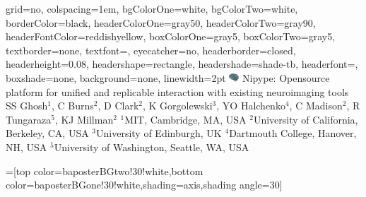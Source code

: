 \documentclass[portrait,final]{baposter}
\begin{document}
\newlength{\leftimgwidth}
\begin{poster}%
  {
  grid=no,
  colspacing=1em,
  bgColorOne=white,
  bgColorTwo=white,
  borderColor=black,
  headerColorOne=gray50,
  headerColorTwo=gray90,
  headerFontColor=reddishyellow,
  boxColorOne=gray5,
  boxColorTwo=gray5,
  textborder=none, %
  textfont=\sf, %
  eyecatcher=no,
  headerborder=closed,
  headerheight=0.08\textheight,
  headershape=rectangle,
  headershade=shade-tb,
  headerfont=\Large\textsf, %
  boxshade=none,
  background=none,
  linewidth=2pt
  }
  {\includegraphics[width=1em]{nipylogo}} %
  {\Large\sf %
  Nipype: Opensource platform for unified and replicable interaction
  with existing neuroimaging tools\vspace{0.3em}}
  {\vspace{0.3em}\sf %
    SS Ghosh$^1$, C Burns$^2$, D Clark$^2$, K Gorgolewski$^3$, YO
    Halchenko$^4$, C Madison$^2$, R Tungaraza$^5$, KJ
    Millman$^2$
    \vspace{0.1em}\normalsize\sf$^1$MIT, Cambridge, MA, USA $^2$University of
    California, Berkeley, CA, USA $^3$University of Edinburgh, UK
    $^4$Dartmouth College, Hanover, NH, USA $^5$University of
    Washington, Seattle, WA, USA}


  =[top color=baposterBGtwo!30!white,bottom color=baposterBGone!30!white,shading=axis,shading angle=30]

     \setlength{\leftimgwidth}{0.78em+8.0em}


\end{poster}
\end{document}
